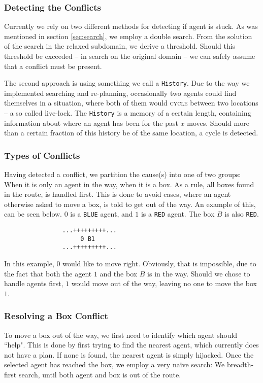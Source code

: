\documentclass[letterpaper]{article}
\begin{document}
		\subsubsection{Detecting the Conflicts}
			Currently we rely on two different methods for detecting if agent is stuck. As was mentioned in section \ref{sec:search}, we employ a double search. From the solution of the search in the relaxed subdomain, we derive a threshold. Should this threshold be exceeded -- in search on the original domain -- we can safely assume that a conflict must be present.

			The second approach is using something we call a \verb=History=. Due to the way we implemented searching and re-planning, occasionally two agents could find themselves in a situation, where both of them would \textsc{cycle} between two locations -- a so called live-lock. The \verb=History= is a memory of a certain length, containing information about where an agent has been for the past $x$ moves. Should more than a certain fraction of this history be of the same location, a cycle is detected.

		\subsubsection{Types of Conflicts}
			Having detected a conflict, we partition the cause(s) into one of two groups: When it is only an agent in the way, when it is a box. As a rule, all boxes found in the route, is handled first. This is done to avoid cases, where an agent otherwise asked to move a box, is told to get out of the way. An example of this, can be seen below. $0$ is a \verb=BLUE= agent, and $1$ is a \verb=RED= agent. The box $B$ is also \verb=RED=. 
			\begin{verbatim}
				...+++++++++...
				     0 B1
				...+++++++++...
			\end{verbatim}
			In this example, $0$ would like to move right. Obviously, that is impossible, due to the fact that both the agent $1$ and the box $B$ is in the way. Should we chose to handle agents first, $1$ would move out of the way, leaving no one to move the box $1$.

		\subsubsection{Resolving a Box Conflict}
			To move a box out of the way, we first need to identify which agent should ``help". This is done by first trying to find the nearest agent, which currently does not have a plan. If none is found, the nearest agent is simply hijacked. Once the selected agent has reached the box, we employ a very naïve search: We breadth-first search, until both agent and box is out of the route.
\end{document}
